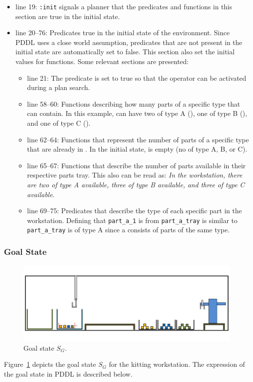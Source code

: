 \begin{itemize}
\item line 19: \texttt{:init} signals a planner that the predicates and functions in this section are true in the initial state.
\item line 20--76: Predicates true in the initial state of the environment. Since PDDL uses a close world assumption, predicates that are not present in the initial state are automatically set to false. This section also set the initial values for functions. Some relevant sections are presented:
\begin{itemize}
\item line 21: The predicate  is set to true so that the operator  can be activated during a plan search.
\item line 58--60: Functions describing how many parts of a specific type that  can contain. In this example,  can have two  of type A (), one  of type B (), and one  of type C ().
\item line 62--64: Functions that represent the number of parts of a specific type that are already in . In the initial state,  is empty (no  of type A, B, or C).
\item line 65--67: Functions that describe the number of parts available in their respective parts tray. This also can be read as: \emph{In the workstation, there are two  of type A available, three  of type B available, and three  of type C available}.
\item line 69--75: Predicates that describe the type of each specific part in the workstation. Defining that \texttt{part\_a\_1} is from \texttt{part\_a\_tray} is similar to \texttt{part\_a\_tray} is of type A since a  consists of parts of the same type.
\end{itemize}
\end{itemize}

\subsubsection{Goal State}
\begin{figure}[h!t!]
\centering
\includegraphics[width=14cm]{Figure/sfinal.jpg}
\caption{Goal state $S_G$.}
\label{fig:sf}
\end{figure}
Figure~\ref{fig:sf} depicts the goal state $S_G$ for the kitting workstation. The expression of the goal state in PDDL is described below.


